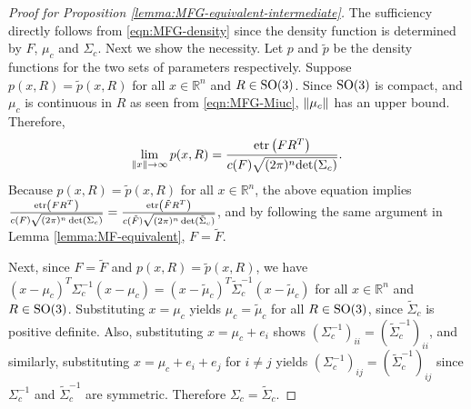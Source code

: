 \begin{proof}[Proof for Proposition \ref{lemma:MFG-equivalent-intermediate}]
	The sufficiency directly follows from \eqref{eqn:MFG-density} since the density function is determined by $F$, $\mu_c$ and $\Sigma_c$.
	Next we show the necessity.
	Let $p$ and $\tilde p$ be the density functions for the two sets of parameters respectively.
	Suppose $p(x,R) = \tilde p(x, R)$  for all $x\in\mathbb{R}^n$ and $R\in\mathrm{SO}(3)$.
	Since $\mathrm{SO}(3)$ is compact, and $\mu_c$ is continuous in $R$ as seen from \eqref{eqn:MFG-Miuc}, $\left\| \mu_c \right\|$ has an upper bound.
	Therefore,
	\begin{equation*}
		\lim\limits_{\left\| x \right\|\to\infty} p(x,R) = \frac{\mathrm{etr}\left( FR^T \right)}{c(F)\sqrt{(2\pi)^n\mathrm{det}({\Sigma}_c)}}.
	\end{equation*}
	Because $p(x,R) = \tilde p(x,R)$ for all $x\in\mathbb{R}^n$, the above equation implies $\frac{\mathrm{etr}\left( FR^T \right)}{c(F)\sqrt{(2\pi)^n\det(\Sigma_c)}} = \frac{\mathrm{etr}\left( \tilde{F}R^T \right)}{c(\tilde{F})\sqrt{(2\pi)^n\det(\tilde{\Sigma}_c)}}$, and by following the same argument in Lemma \ref{lemma:MF-equivalent}, $F=\tilde{F}$.
	
	Next, since $F=\tilde{F}$ and $p(x,R) = \tilde p(x,R)$, we have $(x-\mu_c)^T\Sigma_c^{-1}(x-\mu_c) = (x-\tilde{\mu}_c)^T \tilde{\Sigma}_c^{-1} \allowbreak (x-\tilde{\mu}_c)$ for all $x\in\mathbb{R}^n$ and $R\in\mathrm{SO}(3)$.
	Substituting $x = \mu_c$ yields $\mu_c = \tilde{\mu}_c$ for all $R\in\mathrm{SO}(3)$, since $\tilde{\Sigma}_c$ is positive definite.
	Also, substituting $x = \mu_c+e_i$ shows $(\Sigma_c^{-1})_{ii} = (\tilde{\Sigma}_c^{-1})_{ii}$, and similarly, substituting $x = \mu_c+e_i+e_j$ for $i \neq j$ yields $(\Sigma_c^{-1})_{ij} = (\tilde{\Sigma}_c^{-1})_{ij}$ since $\Sigma_c^{-1}$ and $\tilde{\Sigma}_c^{-1}$ are symmetric.
	Therefore $\Sigma_c = \tilde{\Sigma}_c$.
\end{proof}

